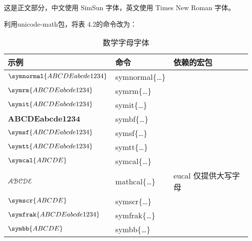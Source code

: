 \documentclass{article}
\begin{document}
这是正文部分，中文使用 SimSun 字体，英文使用 Times New Roman 字体。

利用unicode-math包，将表 4.2的命令改为：
\begin{table}[htp]
  \centering
  \caption{数学字母字体} \label{tbl:math-fonts}
  \begin{tabular}{*{3}{l}}
  \hline
  \textbf{示例}    & \textbf{命令} & \textbf{依赖的宏包}\\
  \hline
  $\symnormal{ABCDE abcde 1234}$  & {symnormal}\{\ldots\}&       \\
  $\symrm{ABCDE abcde 1234}$      & {symrm}\{\ldots\}    &       \\
  $\symit{ABCDE abcde 1234}$      & {symit}\{\ldots\}    &       \\
  $\symbf{ABCDE abcde 1234}$      & {symbf}\{\ldots\}    &       \\
  $\symsf{ABCDE abcde 1234}$      & {symsf}\{\ldots\}    &       \\
  $\symtt{ABCDE abcde 1234}$      & {symtt}\{\ldots\}    &       \\
  $\symcal{ABCDE}$                  & {symcal}\{\ldots\}   &   \\
 \hline
  $\EuScript{ABCDE}$               & {mathcal}\{\ldots\}   & {eucal} 仅提供大写字母 \\
  $\symscr{ABCDE}$                & {symscr}\{\ldots\}   & \\
  $\symfrak{ABCDE abcde 1234}$    & {symfrak}\{\ldots\}  &   \\
  $\symbb{ABCDE}$                 & {symbb}\{\ldots\}    &    \\
  \hline
  \end{tabular}
\end{table}
\end{document}

